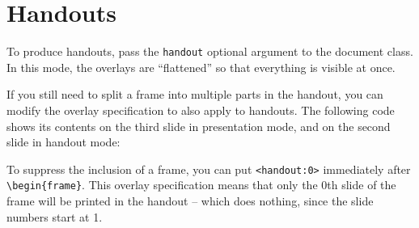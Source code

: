 %
%
\section{Handouts}

To produce handouts, pass the \verb|handout| optional argument to the document class.
In this mode, the overlays are ``flattened'' so that everything is visible at once.

If you still need to split a frame into multiple parts in the handout,
you can modify the overlay specification to also apply to handouts.
The following code shows its contents on the third slide in presentation mode,
and on the second slide in handout mode:
\begin{ExampleCode}
\end{ExampleCode}

To suppress the inclusion of a frame,
you can put \verb|<handout:0>| immediately after \verb|\begin{frame}|.
This overlay specification means that only the 0th slide of the frame will be printed in the handout
-- which does nothing, since the slide numbers start at 1.

